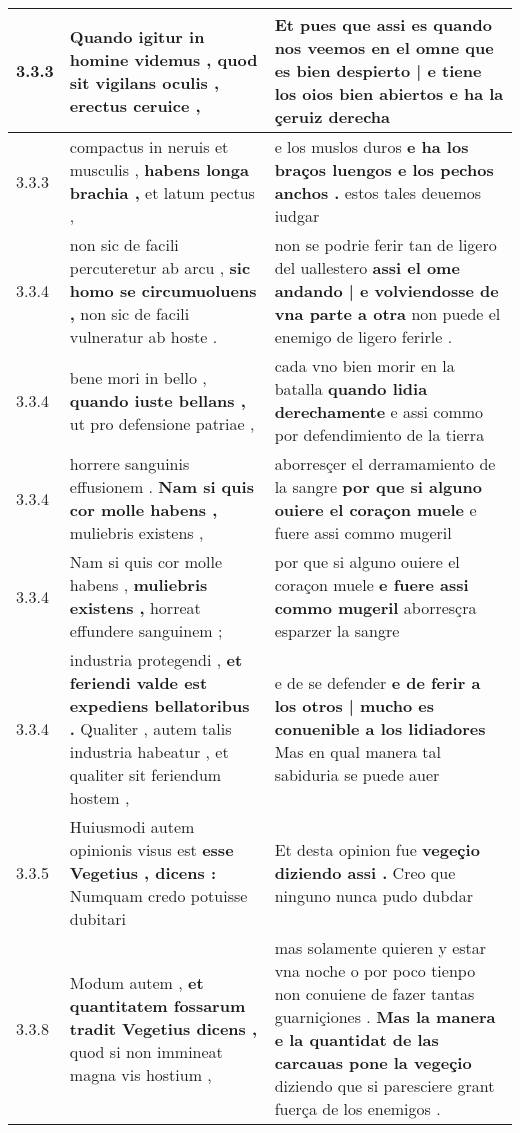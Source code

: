 \begin{tabular}{|p{1cm}|p{6.5cm}|p{6.5cm}|}
3.3.3 & Quando igitur in homine videmus , \textbf{ quod sit vigilans oculis , } erectus ceruice , & Et pues que assi es quando nos veemos en el omne \textbf{ que es bien despierto | e tiene los oios bien abiertos } e ha la çeruiz derecha \\\hline
3.3.3 & compactus in neruis et musculis , \textbf{ habens longa brachia , } et latum pectus , & e los muslos duros \textbf{ e ha los braços luengos e los pechos anchos . } estos tales deuemos iudgar \\\hline
3.3.4 & non sic de facili percuteretur ab arcu , \textbf{ sic homo se circumuoluens , } non sic de facili vulneratur ab hoste . & non se podrie ferir tan de ligero del uallestero \textbf{ assi el ome andando | e volviendosse de vna parte a otra } non puede el enemigo de ligero ferirle . \\\hline
3.3.4 & bene mori in bello , \textbf{ quando iuste bellans , } ut pro defensione patriae , & cada vno bien morir en la batalla \textbf{ quando lidia derechamente } e assi commo por defendimiento de la tierra \\\hline
3.3.4 & horrere sanguinis effusionem . \textbf{ Nam si quis cor molle habens , } muliebris existens , & aborresçer el derramamiento de la sangre \textbf{ por que si alguno ouiere el coraçon muele } e fuere assi commo mugeril \\\hline
3.3.4 & Nam si quis cor molle habens , \textbf{ muliebris existens , } horreat effundere sanguinem ; & por que si alguno ouiere el coraçon muele \textbf{ e fuere assi commo mugeril } aborresçra esparzer la sangre \\\hline
3.3.4 & industria protegendi , \textbf{ et feriendi valde est expediens bellatoribus . } Qualiter , autem talis industria habeatur , et qualiter sit feriendum hostem , & e de se defender \textbf{ e de ferir a los otros | mucho es conuenible a los lidiadores } Mas en qual manera tal sabiduria se puede auer \\\hline
3.3.5 & Huiusmodi autem opinionis visus est \textbf{ esse Vegetius , dicens : } Numquam credo potuisse dubitari & Et desta opinion fue \textbf{ vegeçio diziendo assi . } Creo que ninguno nunca pudo dubdar \\\hline
3.3.8 & Modum autem , \textbf{ et quantitatem fossarum tradit Vegetius dicens , } quod si non immineat magna vis hostium , & mas solamente quieren y estar vna noche o por poco tienpo non conuiene de fazer tantas guarniçiones . \textbf{ Mas la manera e la quantidat de las carcauas pone la vegeçio } diziendo que si paresciere grant fuerça de los enemigos . \\\hline

\end{tabular}
